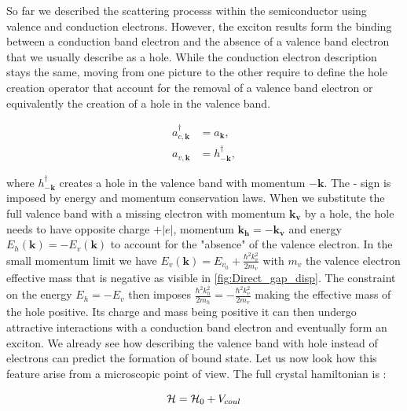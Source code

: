 \label{sub:electron_hole_picture}
So far we described the scattering processs within the semiconductor using valence and conduction electrons. However, the exciton results form the binding between a conduction band electron and the absence of a valence band electron that we usually describe as a hole.
While the conduction electron description stays the same, moving from one picture to the other require to define the hole creation operator that account for the removal of a valence band electron or equivalently the creation of a hole in the valence band.


\begin{subequations}
    \label{eq:hole_creation_operators} %
    \begin{align}
        a^{\dagger}_{c,\mathbf{k}} &= a_{\mathbf{k}},\label{eq:electron_operator} \\
        a_{v,\mathbf{k}} &= h^{\dagger}_{\mathbf{-k}},\label{eq:hole_operator}
    \end{align}
\end{subequations}


\noindent where $h^{\dagger}_{\mathbf{-k}}$ creates a hole in the valence band with momentum $-\mathbf{k}$. The - sign 
is imposed by energy and momentum conservation laws. When we substitute the full valence band with a missing electron with momentum $\mathbf{k_v}$ by a hole, the hole needs to have opposite charge $+|e|$, momentum $\mathbf{k_h}=-\mathbf{k_v}$ and energy $E_h(\mathbf{k})=-E_v(\mathbf{k})$ to account for the "absence" of the valence electron. 
In the small momentum limit we have $E_v(\mathbf{k}) = E_{v_0}+ \frac{\hbar^2 k_v^2}{2m_v}$ with $m_v$ the valence electron effective mass that is negative as visible in \autoref{fig:Direct_gap_disp}.
The constraint on the energy $E_h = -E_v$ then imposes $ \frac{\hbar^2 k_h^2}{2m_h} = - \frac{\hbar^2 k_v^2}{2m_v}$ making the effective mass of the hole positive. Its charge and mass being positive it can then undergo attractive interactions 
with a conduction band electron and eventually form an exciton. We already see how describing the valence band with hole instead of electrons can predict the formation of bound state.
Let us now look how this feature arise from a microscopic point of view. The full crystal hamiltonian is :

\begin{equation}
    \mathcal{H} =  \mathcal{H}_0 + V_{coul}
    \label{eq:crystal_hamiltonian}
\end{equation}

